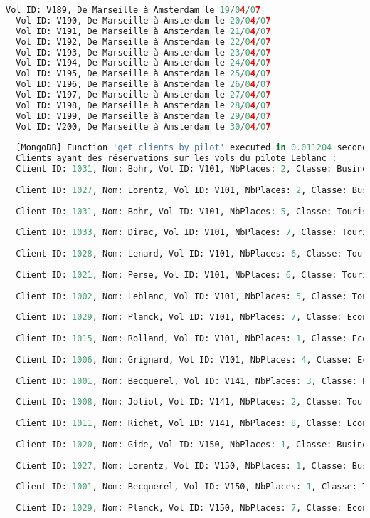 \begin{lstlisting}[language=Python, caption=Résultats des requêtes, label=lst:results_queries]
  Vol ID: V189, De Marseille à Amsterdam le 19/04/07
  Vol ID: V190, De Marseille à Amsterdam le 20/04/07
  Vol ID: V191, De Marseille à Amsterdam le 21/04/07
  Vol ID: V192, De Marseille à Amsterdam le 22/04/07
  Vol ID: V193, De Marseille à Amsterdam le 23/04/07
  Vol ID: V194, De Marseille à Amsterdam le 24/04/07
  Vol ID: V195, De Marseille à Amsterdam le 25/04/07
  Vol ID: V196, De Marseille à Amsterdam le 26/04/07
  Vol ID: V197, De Marseille à Amsterdam le 27/04/07
  Vol ID: V198, De Marseille à Amsterdam le 28/04/07
  Vol ID: V199, De Marseille à Amsterdam le 29/04/07
  Vol ID: V200, De Marseille à Amsterdam le 30/04/07
  
  [MongoDB] Function 'get_clients_by_pilot' executed in 0.011204 seconds
  Clients ayant des réservations sur les vols du pilote Leblanc :
  Client ID: 1031, Nom: Bohr, Vol ID: V101, NbPlaces: 2, Classe: Business
  
  Client ID: 1027, Nom: Lorentz, Vol ID: V101, NbPlaces: 2, Classe: Business
  
  Client ID: 1031, Nom: Bohr, Vol ID: V101, NbPlaces: 5, Classe: Touriste
  
  Client ID: 1033, Nom: Dirac, Vol ID: V101, NbPlaces: 7, Classe: Touriste
  
  Client ID: 1028, Nom: Lenard, Vol ID: V101, NbPlaces: 6, Classe: Touriste
  
  Client ID: 1021, Nom: Perse, Vol ID: V101, NbPlaces: 6, Classe: Touriste
  
  Client ID: 1002, Nom: Leblanc, Vol ID: V101, NbPlaces: 5, Classe: Touriste
  
  Client ID: 1029, Nom: Planck, Vol ID: V101, NbPlaces: 7, Classe: Economique
  
  Client ID: 1015, Nom: Rolland, Vol ID: V101, NbPlaces: 1, Classe: Economique
  
  Client ID: 1006, Nom: Grignard, Vol ID: V101, NbPlaces: 4, Classe: Economique
  
  Client ID: 1001, Nom: Becquerel, Vol ID: V141, NbPlaces: 3, Classe: Business
  
  Client ID: 1008, Nom: Joliot, Vol ID: V141, NbPlaces: 2, Classe: Touriste
  
  Client ID: 1011, Nom: Richet, Vol ID: V141, NbPlaces: 8, Classe: Economique
  
  Client ID: 1020, Nom: Gide, Vol ID: V150, NbPlaces: 1, Classe: Business
  
  Client ID: 1027, Nom: Lorentz, Vol ID: V150, NbPlaces: 1, Classe: Business
  
  Client ID: 1001, Nom: Becquerel, Vol ID: V150, NbPlaces: 1, Classe: Touriste
  
  Client ID: 1029, Nom: Planck, Vol ID: V150, NbPlaces: 7, Classe: Economique
\end{lstlisting}

